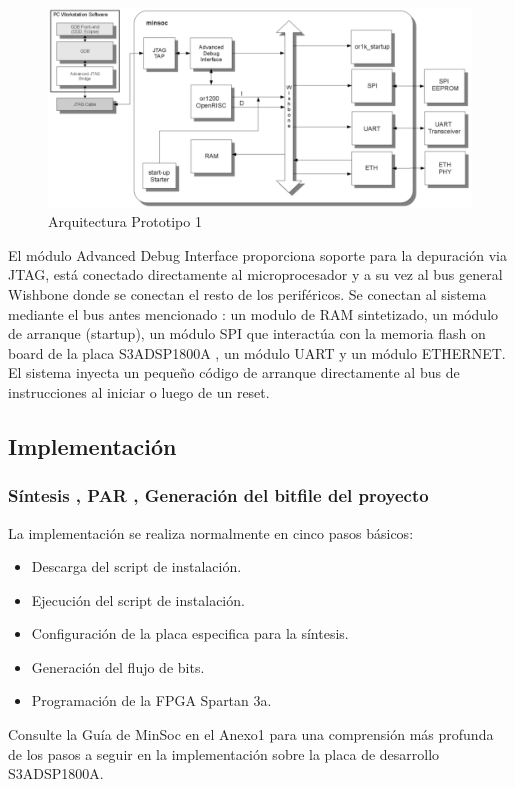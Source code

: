 		\begin{figure}[!h]
 		\begin{center}
  		\includegraphics[width=1\textwidth,keepaspectratio=true]{./images/minsoc}
  		\caption{Arquitectura Prototipo 1}
  		\label{fig:minsoc}
 		\end{center}
		\end{figure}
		
		El módulo Advanced Debug Interface proporciona soporte para la depuración via JTAG, está conectado directamente al microprocesador y a su vez al bus
		general Wishbone donde se conectan el resto de los periféricos. Se conectan al sistema mediante el bus antes mencionado : un modulo	de RAM
		sintetizado, un módulo de arranque (startup), un módulo SPI que interactúa con la memoria flash on board de la placa S3ADSP1800A , un módulo UART y
		un módulo ETHERNET. El sistema inyecta un pequeño código de arranque directamente al bus de instrucciones al iniciar o luego de un reset. 
			
		\subsection{Implementación}
		\subsubsection{Síntesis , PAR , Generación del bitfile del proyecto}
La implementación se realiza normalmente en cinco pasos básicos: 
\begin {itemize}
\item Descarga del script de instalación.
\item Ejecución del script de instalación.
\item Configuración de la placa especifica para la síntesis.
\item Generación del flujo de bits.
\item Programación de la FPGA Spartan 3a.
 \end {itemize}
 Consulte la Guía de MinSoc en el Anexo1 para una comprensión más profunda de los pasos a seguir en la implementación sobre la placa de desarrollo S3ADSP1800A.

